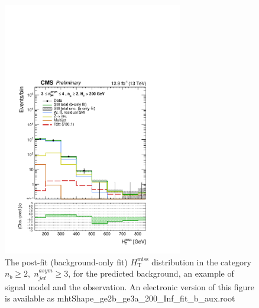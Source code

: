 \begin{figure}[tbhp]
    \caption{ 
    The post-fit (background-only fit) $H_{\mathrm{T}}^{\mathrm{miss}}$ distribution in the category $n_{b}\geq 2, \; n_{jet}^{asym} \geq 3$, 
    for the predicted background, an example of signal model and the observation.
    An electronic version of this figure is available as mhtShape\_ge2b\_ge3a\_200\_Inf\_fit\_b\_aux.root
    \label{fig:mhtShape_ge2b_ge3a_fit_b} }
  \begin{center}
  \includegraphics[width=0.7\textwidth]{mhtShape_ge2b_ge3a_200_Inf_fit_b_aux}
  \end{center}
\end{figure}


